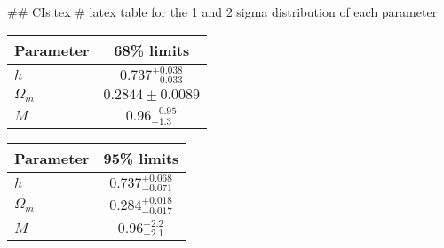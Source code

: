 ## CIs.tex
# latex table for the 1 and 2 sigma distribution of each parameter

\begin{tabular} { l  c}
 Parameter &  68\% limits\\
\hline
{\boldmath$h              $} & $0.737^{+0.038}_{-0.033}   $\\
{\boldmath$\Omega_m       $} & $0.2844\pm 0.0089          $\\
{\boldmath$M              $} & $0.96^{+0.95}_{-1.3}       $\\
\hline
\end{tabular}

\begin{tabular} { l  c}
 Parameter &  95\% limits\\
\hline
{\boldmath$h              $} & $0.737^{+0.068}_{-0.071}   $\\
{\boldmath$\Omega_m       $} & $0.284^{+0.018}_{-0.017}   $\\
{\boldmath$M              $} & $0.96^{+2.2}_{-2.1}        $\\
\hline
\end{tabular}

